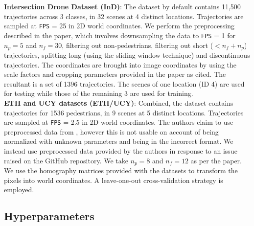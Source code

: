 \textbf{Intersection Drone Dataset (InD)}: \cite{inDdataset} The dataset by default contains 11,500 trajectories across 3 classes, in 32 scenes at 4 distinct locations. Trajectories are sampled at \texttt{FPS} = 25 in 2D world coordinates. We perform the preprocessing described in the paper, which involves downsampling the data to \texttt{FPS} = 1 for $n_p = 5$ and $n_f = 30$, filtering out non-pedestrians, filtering out short ($<n_f+n_p$) trajectories, splitting long (using the sliding window technique) and discontinuous trajectories. The coordinates are brought into image coordinates by using the scale factors and cropping parameters provided in the paper as cited. The resultant is a set of 1396 trajectories. The scenes of one location (ID 4) are used for testing while those of the remaining 3 are used for training.\\

\textbf{ETH and UCY datasets (ETH/UCY)}: Combined, the dataset contains trajectories for 1536 pedestrians, in 9 scenes at 5 distinct locations. Trajectories are sampled at \texttt{FPS} = 2.5 in 2D world coordinates. The authors claim to use preprocessed data from \cite{DBLP:journals/corr/abs-1803-10892}, however this is not usable on account of being normalized with unknown parameters and being in the incorrect format. We instead use preprocessed data provided by the authors in response to an issue raised on the GitHub repository. We take $n_p = 8$ and $n_f = 12$ as per the paper. We use the homography matrices provided with the datasets to transform the pixels into world coordinates. A leave-one-out cross-validation strategy is employed. 



\newline
\subsection{Hyperparameters}

